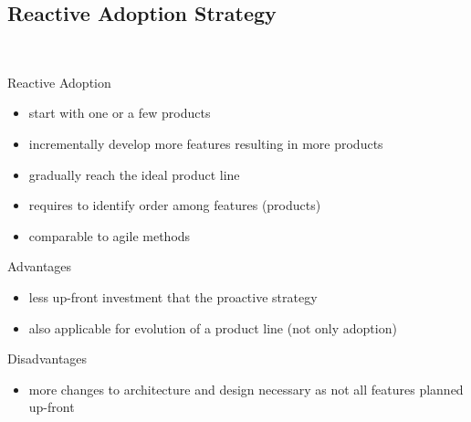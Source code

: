 \subsection{Reactive Adoption Strategy}
\begin{frame}{\myframetitle\ }
	\begin{mycolumns}[animation=none]
		\begin{definition}{Reactive Adoption}
			\begin{itemize}
				\item start with one or a few products
				\item incrementally develop more features resulting in more products
				\item gradually reach the ideal product line
				\item requires to identify order among features (products)
				\item comparable to agile methods
			\end{itemize}
		\end{definition}
	\mynextcolumn
		\begin{note}{Advantages}
			\begin{itemize}
				\item less up-front investment that the proactive strategy
				\item also applicable for evolution of a product line (not only adoption)
			\end{itemize}
		\end{note}
		\begin{note}{Disadvantages}
			\begin{itemize}
				\item more changes to architecture and design necessary as not all features planned up-front
			\end{itemize}
		\end{note}
	\end{mycolumns}
\end{frame}



